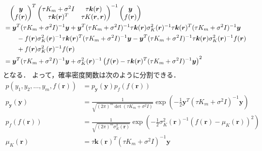 \begin{align}
     & \hphantom{=}
    \begin{pmatrix}
        \bm{y} \\ f(\bm{r})
    \end{pmatrix}^T
    \begin{pmatrix}
        \tau K_m + \sigma^2 I & \tau \bm{k}(\bm{r})    \\
        \tau \bm{k}(\bm{r})^T & \tau K(\bm{r}, \bm{r})
    \end{pmatrix}^{-1}
    \begin{pmatrix}
        \bm{y} \\ f(\bm{r})
    \end{pmatrix}
    \notag                                            \\
     & = \bm{y}^T (\tau K_m + \sigma^2 I)^{-1} \bm{y}
    + \bm{y}^T (\tau K_m + \sigma^2 I)^{-1} \tau \bm{k}(\bm{r}) \sigma_K^2(\bm{r})^{-1} \tau \bm{k}(\bm{r})^T (\tau K_m + \sigma^2 I)^{-1} \bm{y}
    \notag                                            \\ & \hspace{2em}
    - f(\bm{r}) \sigma_K^2(\bm{r})^{-1} \tau \bm{k}(\bm{r})^T (\tau K_m + \sigma^2 I)^{-1} \bm{y}
    - \bm{y}^T (\tau K_m + \sigma^2 I)^{-1} \tau \bm{k}(\bm{r}) \sigma_K^2(\bm{r})^{-1} f(\bm{r})
    \notag                                            \\ & \hspace{2em}
    + f(\bm{r}) \sigma_K^2(\bm{r})^{-1} f(\bm{r})
    \notag                                            \\
     & = \bm{y}^T (\tau K_m + \sigma^2 I)^{-1} \bm{y}
    + \sigma_K^2(\bm{r})^{-1} \left(f(\bm{r}) - \tau \bm{k}(\bm{r})^T (\tau K_m + \sigma^2 I)^{-1} \bm{y}\right)^2
\end{align}
となる．
よって，確率密度関数は次のように分割できる．
\begin{align}
    p(y_1, y_2, \ldots, y_m, f(\bm{r}))
     & = p_{\bm{y}}(\bm{y}) p_f(f(\bm{r}))
    \\
    p_{\bm{y}}(\bm{y})
     & = \frac{1}{\sqrt{(2\pi)^{m} \det(\tau K_m + \sigma^2 I)}}
    \exp\left(-\frac{1}{2} \bm{y}^T (\tau K_m + \sigma^2 I)^{-1} \bm{y} \right)
    \\
    p_f(f(\bm{r}))
     & = \frac{1}{\sqrt{(2\pi)^{m} \sigma_K^2(\bm{r})}}
    \exp\left(-\frac{1}{2} \sigma_K^2(\bm{r})^{-1} \left(f(\bm{r}) - \mu_K(\bm{r})\right)^2\right)
    \\
    \mu_K(\bm{r})
     & = \tau \bm{k}(\bm{r})^T (\tau K_m + \sigma^2 I)^{-1} \bm{y}
\end{align}
